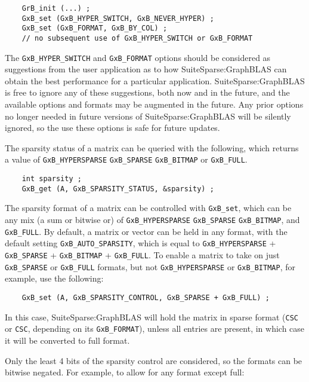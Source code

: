\documentclass[12pt]{article}
\begin{document}
{\footnotesize
\begin{verbatim}
    GrB_init (...) ;
    GxB_set (GxB_HYPER_SWITCH, GxB_NEVER_HYPER) ;
    GxB_set (GxB_FORMAT, GxB_BY_COL) ;
    // no subsequent use of GxB_HYPER_SWITCH or GxB_FORMAT
\end{verbatim} }

The \verb'GxB_HYPER_SWITCH' and \verb'GxB_FORMAT' options should be considered as
suggestions from the user application as to how SuiteSparse:GraphBLAS can
obtain the best performance for a particular application.
SuiteSparse:GraphBLAS is free to ignore any of these suggestions, both now and
in the future, and the available options and formats may be augmented in the
future.  Any prior options no longer needed in future versions of
SuiteSparse:GraphBLAS will be silently ignored, so the use these options is
safe for future updates.

The sparsity status of a matrix can be queried with the following, which
returns a value of \verb'GxB_HYPERSPARSE' \verb'GxB_SPARSE' \verb'GxB_BITMAP'
or \verb'GxB_FULL'.

{\footnotesize
\begin{verbatim}
    int sparsity ;
    GxB_get (A, GxB_SPARSITY_STATUS, &sparsity) ; \end{verbatim}}

The sparsity format of a matrix can be controlled with \verb'GxB_set', which
can be any mix (a sum or bitwise or) of \verb'GxB_HYPERSPARSE'
\verb'GxB_SPARSE' \verb'GxB_BITMAP', and \verb'GxB_FULL'.  By default, a matrix
or vector can be held in any format, with the default setting
\verb'GxB_AUTO_SPARSITY', which is equal to \verb'GxB_HYPERSPARSE' +
\verb'GxB_SPARSE' + \verb'GxB_BITMAP' + \verb'GxB_FULL'.  To enable a matrix to
take on just \verb'GxB_SPARSE' or \verb'GxB_FULL' formats, but not
\verb'GxB_HYPERSPARSE' or \verb'GxB_BITMAP', for example, use the following:

{\footnotesize
\begin{verbatim}
    GxB_set (A, GxB_SPARSITY_CONTROL, GxB_SPARSE + GxB_FULL) ; \end{verbatim}}

In this case, SuiteSparse:GraphBLAS will hold the matrix in sparse format
(\verb'CSC' or \verb'CSC', depending on its \verb'GxB_FORMAT'), unless all
entries are present, in which case it will be converted to full format.

Only the least 4 bits of the sparsity control are considered, so the
formats can be bitwise negated.  For example, to allow for any format
except full:
\end{document}
